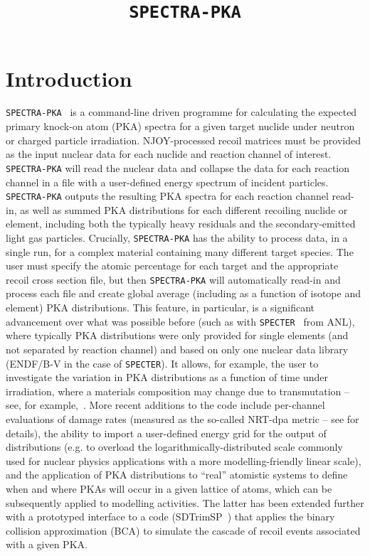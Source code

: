 \documentclass[a4paper]{article}
\begin{document}
\title{\texttt{SPECTRA-PKA}}

\maketitle
\section{Introduction}
\texttt{SPECTRA-PKA}~\cite{gilbertmariansublet2015,gilbertsubletNME2016,gilbertsublet2018,spectrapkaavailablefrom} is a command-line driven programme for calculating the expected primary knock-on atom (PKA) spectra for a given target nuclide under neutron or charged particle irradiation. NJOY-processed recoil matrices must be provided as the input nuclear data for each nuclide and reaction channel of interest. \texttt{SPECTRA-PKA} will read the nuclear data and collapse the data for each reaction channel in a file with a user-defined energy spectrum of incident particles. \texttt{SPECTRA-PKA} outputs the resulting PKA spectra for each reaction channel read-in, as well as summed PKA distributions for each different recoiling nuclide or element, including both the typically heavy residuals and the secondary-emitted light gas particles. Crucially, \texttt{SPECTRA-PKA} has the ability to process data, in a single run, for a complex material containing many different target species. The user must specify the atomic percentage for each target and the appropriate recoil cross section file, but then \texttt{SPECTRA-PKA} will automatically read-in and process each file and create global average (including as a function of isotope and element) PKA distributions. This feature, in particular, is a significant advancement over what was possible before (such as with \texttt{SPECTER}~\cite{specter} from ANL), where typically PKA distributions were only provided for single elements (and not separated by reaction channel) and based on only one nuclear data library (ENDF/B-V in the case of \texttt{SPECTER}). It allows, for example, the user to investigate the variation in PKA distributions as a function of time under irradiation, where a materials composition may change due to transmutation -- see, for example,~\cite{gilbertsubletNME2016}. More recent additions to the code include per-channel evaluations of damage rates (measured as the so-called NRT-dpa metric -- see \cite{gilbertsublet2018} for details), the ability to import a user-defined energy grid for the output of distributions (e.g. to overload the logarithmically-distributed scale commonly used for nuclear physics applications with a more modelling-friendly linear scale), and the application of PKA distributions to ``real'' atomistic systems to define when and where PKAs will occur in a given lattice of atoms, which can be subsequently applied to modelling activities.  The latter has been extended further with a prototyped interface to a code (SDTrimSP~\cite{sdtrimsp}) that applies the binary collision approximation (BCA) to simulate the cascade of recoil events associated with a given PKA.
\end{document}
